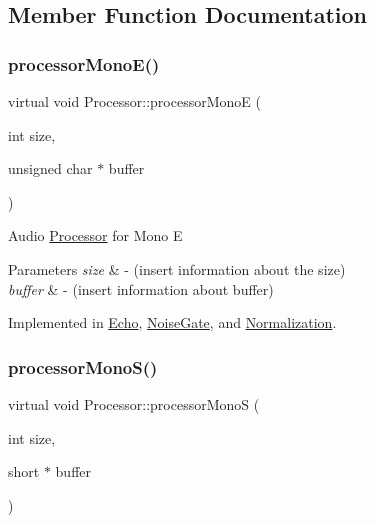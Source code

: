 \subsection{Member Function Documentation}
\mbox{\label{classProcessor_aa9742b5df48a3c6442d521ce93012fc1}} 
\subsubsection{\texorpdfstring{processor\+Mono\+E()}{processorMonoE()}}
{\footnotesize\ttfamily virtual void Processor\+::processor\+MonoE (\begin{DoxyParamCaption}\item[{int}]{size,  }\item[{unsigned char $\ast$}]{buffer }\end{DoxyParamCaption})\hspace{0.3cm}{\ttfamily [pure virtual]}}

Audio \hyperlink{classProcessor}{Processor} for Mono E 
\begin{DoxyParams}{Parameters}
{\em size} & -\/ (insert information about the size) \\
\hline
{\em buffer} & -\/ (insert information about buffer) \\
\hline
\end{DoxyParams}


Implemented in \hyperlink{classEcho_a472cc906604bcb493c6a6c1227436938}{Echo}, \hyperlink{classNoiseGate_ab2965cbd79e9bb7cd5d972967d3da678}{Noise\+Gate}, and \hyperlink{classNormalization_a61d6afdd8530c60ef098c2e404841683}{Normalization}.

\mbox{\label{classProcessor_a4cf32c9f7e26383490e8fb49defcc287}} 
\subsubsection{\texorpdfstring{processor\+Mono\+S()}{processorMonoS()}}
{\footnotesize\ttfamily virtual void Processor\+::processor\+MonoS (\begin{DoxyParamCaption}\item[{int}]{size,  }\item[{short $\ast$}]{buffer }\end{DoxyParamCaption})\hspace{0.3cm}{\ttfamily [pure virtual]}}

